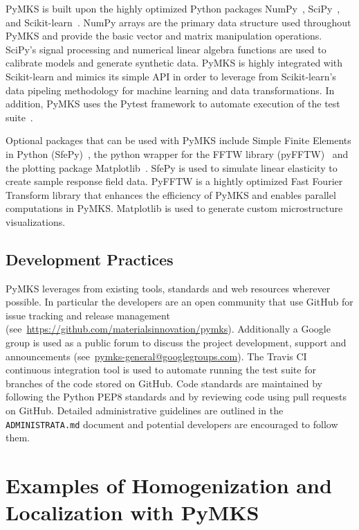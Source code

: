 \documentclass{bmcart}
\begin{document}
PyMKS is built upon the highly optimized Python packages
NumPy~\cite{van2011numpy}, SciPy~\cite{jones2014scipy}, and
Scikit-learn~\cite{pedregosa2011scikit}. NumPy arrays are the primary
data structure used throughout PyMKS and provide the basic vector and
matrix manipulation operations. SciPy's signal processing and
numerical linear algebra functions are used to calibrate models and
generate synthetic data. PyMKS is highly integrated with Scikit-learn
and mimics its simple API in order to leverage from Scikit-learn's
data pipeling methodology for machine learning and data
transformations. In addition, PyMKS uses the Pytest framework to
automate execution of the test suite~\cite{pytest2016}.

Optional packages that can be used with PyMKS include Simple Finite
Elements in Python (SfePy)~\cite{cimrman2014sfepy}, the python wrapper
for the FFTW library (pyFFTW)~\cite{frigo1998fftw} and the plotting
package Matplotlib~\cite{hunter2007matplotlib}. SfePy is used to
simulate linear elasticity to create sample response field
data. PyFFTW is a hightly optimized Fast Fourier Transform library
that enhances the efficiency of PyMKS and enables parallel
computations in PyMKS. Matplotlib is used to generate custom
microstructure visualizations.

\subsection{Development Practices}

PyMKS leverages from existing tools, standards and web resources
wherever possible. In particular the developers are an open community
that use GitHub for issue tracking and release management
(see~\url{https://github.com/materialsinnovation/pymks}). Additionally
a Google group is used as a public forum to discuss the project
development, support and announcements
(see~\url{pymks-general@googlegroups.com}). The Travis CI continuous
integration tool is used to automate running the test suite for
branches of the code stored on GitHub. Code standards are maintained
by following the Python PEP8 standards and by reviewing code using
pull requests on GitHub. Detailed administrative guidelines are
outlined in the \texttt{ADMINISTRATA.md} document and potential
developers are encouraged to follow them.

\section{Examples of Homogenization and Localization with PyMKS}
\end{document}

